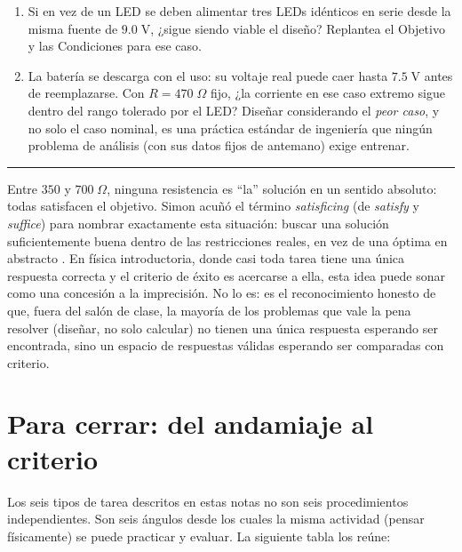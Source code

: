 \documentclass[11pt]{book}
\begin{document}
\begin{enumerate}
\begin{description}
\begin{enumerate}
    \item Si en vez de un LED se deben alimentar tres LEDs idénticos en serie desde la misma fuente de $9.0\;\text{V}$, ¿sigue siendo viable el diseño? Replantea el Objetivo y las Condiciones para ese caso.
    \item La batería se descarga con el uso: su voltaje real puede caer hasta $7.5\;\text{V}$ antes de reemplazarse. Con $R = 470\;\Omega$ fijo, ¿la corriente en ese caso extremo sigue dentro del rango tolerado por el LED? Diseñar considerando el {\it peor caso}, y no solo el caso nominal, es una práctica estándar de ingeniería que ningún problema de análisis (con sus datos fijos de antemano) exige entrenar.
\end{enumerate}

\end{description}
\end{enumerate}

\medskip
\noindent\rule{\linewidth}{0.4pt}


\medskip
Entre $350$ y $700\;\Omega$, ninguna resistencia es ``la'' solución en un sentido absoluto: todas satisfacen el objetivo. Simon acuñó el término {\it satisficing} (de {\it satisfy} y {\it suffice}) para nombrar exactamente esta situación: buscar una solución suficientemente buena dentro de las restricciones reales, en vez de una óptima en abstracto \cite{Simon1996}. En física introductoria, donde casi toda tarea tiene una única respuesta correcta y el criterio de éxito es acercarse a ella, esta idea puede sonar como una concesión a la imprecisión. No lo es: es el reconocimiento honesto de que, fuera del salón de clase, la mayoría de los problemas que vale la pena resolver (diseñar, no solo calcular) no tienen una única respuesta esperando ser encontrada, sino un espacio de respuestas válidas esperando ser comparadas con criterio.

\section*{Para cerrar: del andamiaje al criterio}

Los seis tipos de tarea descritos en estas notas no son seis procedimientos independientes. Son seis ángulos desde los cuales la misma actividad (pensar físicamente) se puede practicar y evaluar. La siguiente tabla los reúne:
\end{document}
